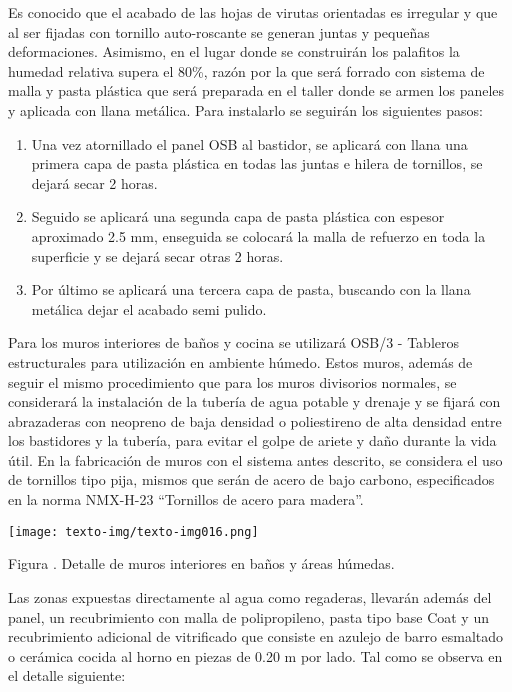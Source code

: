 \documentclass{article}
\newcounter{Figura}
\renewcommand\theFigura{\arabic{Figura}}
\begin{document}
\bigskip

Es conocido que el acabado de las hojas de virutas orientadas es irregular y que al ser fijadas con tornillo auto-roscante se generan juntas y pequeñas deformaciones. Asimismo, en el lugar donde se construirán los palafitos la humedad relativa supera el 80\%, razón por la que será forrado con sistema de malla y pasta plástica que será preparada en el taller donde se armen los paneles y aplicada con llana metálica. Para instalarlo se seguirán los siguientes pasos:


\bigskip

\begin{enumerate}
\item Una vez atornillado el panel OSB al bastidor, se aplicará con llana una primera capa de pasta plástica en todas las juntas e hilera de tornillos, se dejará secar 2 horas.
\item Seguido se aplicará una segunda capa de pasta plástica con espesor aproximado 2.5 mm, enseguida se colocará la malla de refuerzo en toda la superficie y se dejará secar otras 2 horas.
\item Por último se aplicará una tercera capa de pasta, buscando con la llana metálica dejar el acabado semi pulido.
\end{enumerate}

\bigskip

Para los muros interiores de baños y cocina se utilizará OSB/3 - Tableros estructurales para utilización en ambiente húmedo. Estos muros, además de seguir el mismo procedimiento que para los muros divisorios normales, se considerará la instalación de la tubería de agua potable y drenaje y se fijará con abrazaderas con neopreno de baja densidad o poliestireno de alta densidad entre los bastidores y la tubería, para evitar el golpe de ariete y daño durante la vida útil. En la fabricación de muros con el sistema antes descrito, se considera el uso de tornillos tipo pija, mismos que serán de acero de bajo carbono, especificados en la norma NMX-H-23 “Tornillos de acero para madera”.

 \texttt{[image: texto-img/texto-img016.png]} 


\bigskip

Figura \stepcounter{Figura}{\theFigura}. Detalle de muros interiores en baños y áreas húmedas.


\bigskip

Las zonas expuestas directamente al agua como regaderas, llevarán además del panel, un recubrimiento con malla de polipropileno, pasta tipo base Coat y un recubrimiento adicional de vitrificado que consiste en azulejo de barro esmaltado o cerámica cocida al horno en piezas de 0.20 m por lado. Tal como se observa en el detalle siguiente:
\end{document}
